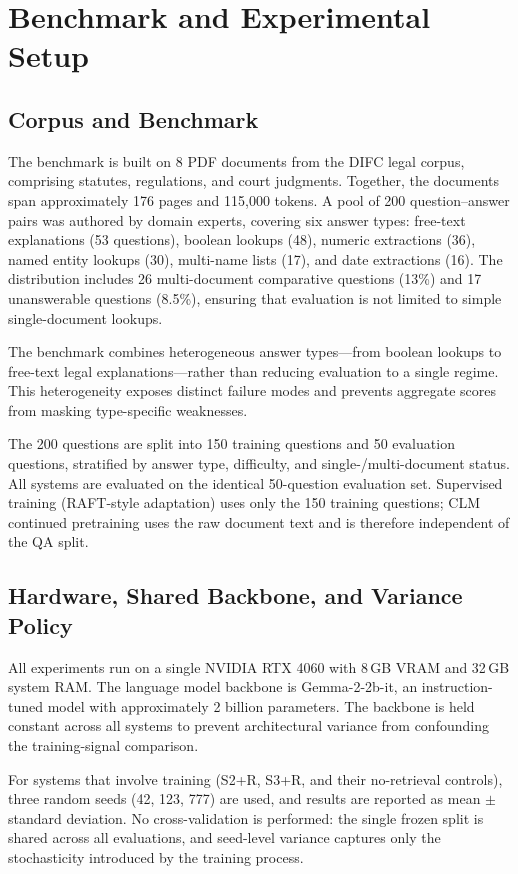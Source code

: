 \newpage
\section{Benchmark and Experimental Setup}

\subsection{Corpus and Benchmark}

The benchmark is built on 8 PDF documents from the DIFC legal corpus, comprising statutes, regulations, and court judgments. Together, the documents span approximately 176 pages and 115,000 tokens. A pool of 200 question--answer pairs was authored by domain experts, covering six answer types: free-text explanations (53 questions), boolean lookups (48), numeric extractions (36), named entity lookups (30), multi-name lists (17), and date extractions (16). The distribution includes 26 multi-document comparative questions (13\%) and 17 unanswerable questions (8.5\%), ensuring that evaluation is not limited to simple single-document lookups.

The benchmark combines heterogeneous answer types---from boolean lookups to free-text legal explanations---rather than reducing evaluation to a single regime. This heterogeneity exposes distinct failure modes and prevents aggregate scores from masking type-specific weaknesses.

The 200 questions are split into 150 training questions and 50 evaluation questions, stratified by answer type, difficulty, and single-/multi-document status. All systems are evaluated on the identical 50-question evaluation set. Supervised training (RAFT-style adaptation) uses only the 150 training questions; CLM continued pretraining uses the raw document text and is therefore independent of the QA split.

\subsection{Hardware, Shared Backbone, and Variance Policy}

All experiments run on a single NVIDIA RTX 4060 with 8\,GB VRAM and 32\,GB system RAM. The language model backbone is Gemma-2-2b-it, an instruction-tuned model with approximately 2 billion parameters. The backbone is held constant across all systems to prevent architectural variance from confounding the training-signal comparison.

For systems that involve training (S2+R, S3+R, and their no-retrieval controls), three random seeds (42, 123, 777) are used, and results are reported as mean $\pm$ standard deviation. No cross-validation is performed: the single frozen split is shared across all evaluations, and seed-level variance captures only the stochasticity introduced by the training process.


